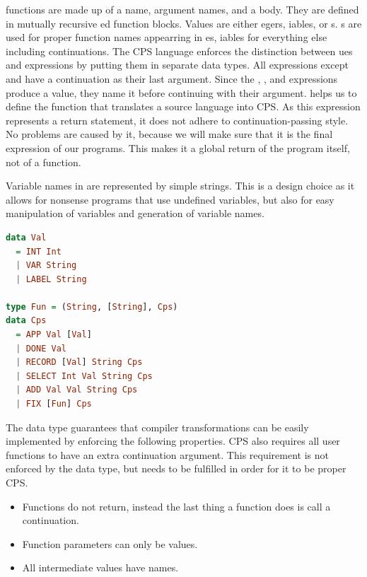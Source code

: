 { functions are made up of a name, argument names, and a body. They are defined in mutually recursive ed function blocks. Values are either egers, iables, or s. s are used for proper function names appearring in es, iables for everything else including continuations. The CPS language enforces the distinction between ues and  expressions by putting them in separate data types. All expressions except  and  have a  continuation as their last argument. Since the , , and  expressions produce a value, they name it before continuing with their  argument.  helps us to define the function that translates a source language into CPS. As this expression represents a return statement, it does not adhere to continuation-passing style. No problems are caused by it, because we will make sure that it is the final expression of our programs. This makes it a global return of the program itself, not of a function.

Variable names in  are represented by simple strings. This is a design choice as it allows for nonsense programs that use undefined variables, but also for easy manipulation of variables and generation of variable names.

\begin{lstlisting}[language=Haskell]
data Val
  = INT Int
  | VAR String
  | LABEL String
  
type Fun = (String, [String], Cps)
data Cps
  = APP Val [Val]
  | DONE Val
  | RECORD [Val] String Cps
  | SELECT Int Val String Cps
  | ADD Val Val String Cps
  | FIX [Fun] Cps
\end{lstlisting}

The  data type guarantees that compiler transformations can be easily implemented by enforcing the following properties. CPS also requires all user functions to have an extra continuation argument. This requirement is not enforced by the data type, but needs to be fulfilled in order for it to be proper CPS.

\begin{itemize}
\item Functions do not return, instead the last thing a function does is call a continuation.
\item Function parameters can only be values.
\item All intermediate values have names.
\end{itemize}

}

